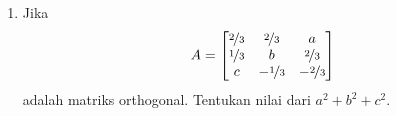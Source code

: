 \begin{enumerate}
\item Jika \[A=\begin{bmatrix}\nicefrac{2}{3} & \nicefrac{2}{3} & a\\ \nicefrac{1}{3} & b & \nicefrac{2}{3}\\ c & -\nicefrac{1}{3} & -\nicefrac{2}{3}\end{bmatrix}\] adalah matriks orthogonal. Tentukan nilai dari $a^2+b^2+c^2$.
\end{enumerate}